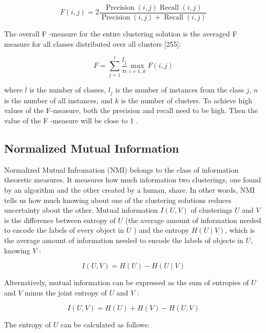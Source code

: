 \begin{equation*}
F(i, j)=2 \frac{\operatorname{Precision}(i, j) \operatorname{Recall}(i, j)}{\operatorname{Precision}(i, j)+\operatorname{Recall}(i, j)} \tag{12.47}
\end{equation*}


The overall F -measure for the entire clustering solution is the averaged F measure for all classes distributed over all clusters [255]:


\begin{equation*}
F=\sum_{j=1}^{l} \frac{l_{j}}{n} \max _{i=1 . . k} F(i, j) \tag{12.48}
\end{equation*}


where $l$ is the number of classes, $l_{j}$ is the number of instances from the class $j$, $n$ is the number of all instances, and $k$ is the number of clusters. To achieve high values of the F-measure, both the precision and recall need to be high. Then the value of the F -measure will be close to 1 .

\subsection{Normalized Mutual Information}
Normalized Mutual Infromation (NMI) belongs to the class of information theoretic measures. It measures how much information two clusterings, one found by an algorithm and the other created by a human, share. In other words, NMI tells us how much knowing about one of the clustering solutions reduces uncertainty about the other. Mutual information $I(U, V)$ of clusterings $U$ and $V$ is the difference between entropy of $U$ (the average amount of information needed to encode the labels of every object in $U$ ) and the entropy $H(U \mid V)$, which is the average amount of information needed to encode the labels of objects in $U$, knowing $V$ :


\begin{equation*}
I(U, V)=H(U)-H(U \mid V) \tag{12.49}
\end{equation*}


Alternatively, mutual information can be expressed as the sum of entropies of $U$ and $V$ minus the joint entropy of $U$ and $V$ :


\begin{equation*}
I(U, V)=H(U)+H(V)-H(U, V) \tag{12.50}
\end{equation*}


The entropy of $U$ can be calculated as follows:



